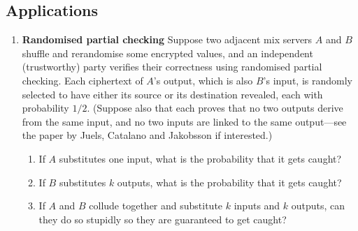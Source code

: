 \documentclass[11pt]{article} %
\begin{document}
\subsection{Applications}
\begin{enumerate}
\item {\bf Randomised partial checking}  Suppose two adjacent mix servers $A$ and $B$ shuffle and rerandomise some encrypted values, and an independent (trustworthy) party verifies their correctness using randomised partial checking.  Each ciphertext of $A$'s output, which is also $B$'s input, is randomly selected to have either its source or its destination revealed, each with probability $1/2$.  (Suppose also that each proves that no two outputs derive from the same input, and no two inputs are linked to the same output---see the paper by Juels, Catalano and Jakobsson if interested.)  
	\begin{enumerate}
	\item If $A$ substitutes one input, what is the probability that it gets caught?
	\item If $B$ substitutes $k$ outputs, what is the probability that it gets caught?
	\item If $A$ and $B$ collude together and substitute $k$ inputs and $k$ outputs, can they do so stupidly so they are guaranteed to get caught?  
	\end{enumerate}
\end{enumerate}
\end{document}
